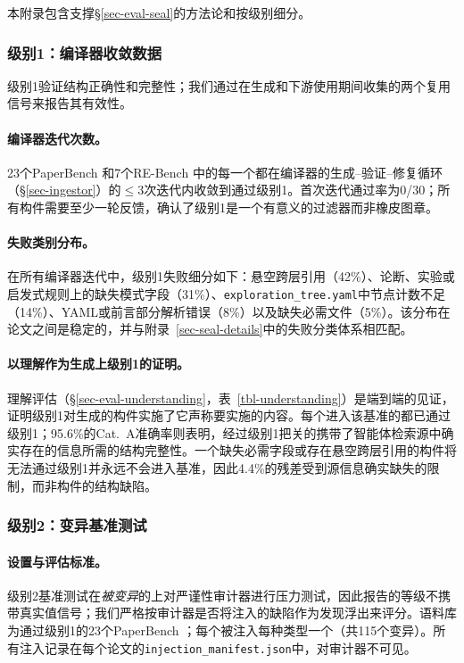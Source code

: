 本附录包含支撑\S\ref{sec-eval-seal}的方法论和按级别细分。

\subsubsection{级别1：编译器收敛数据}
\label{sec-seal-eval-l1}

级别1验证结构正确性和完整性；我们通过在\ara{}生成和下游使用期间收集的两个复用信号来报告其有效性。

\paragraph{编译器迭代次数。}
23个PaperBench \ara{}和7个RE-Bench \ara{}中的每一个都在编译器的生成--验证--修复循环（\S\ref{sec-ingestor}）的$\leq 3$次迭代内收敛到通过级别1。首次迭代通过率为0/30；所有构件需要至少一轮反馈，确认了级别1是一个有意义的过滤器而非橡皮图章。

\paragraph{失败类别分布。}
在所有编译器迭代中，级别1失败细分如下：悬空跨层引用（42\%）、论断、实验或启发式规则上的缺失模式字段（31\%）、\texttt{exploration\_tree.yaml}中节点计数不足（14\%）、YAML或前言部分解析错误（8\%）以及缺失必需文件（5\%）。该分布在论文之间是稳定的，并与附录~\ref{sec-seal-details}中的失败分类体系相匹配。

\paragraph{以理解作为生成\ara{}上级别1的证明。}
理解评估（\S\ref{sec-eval-understanding}，表~\ref{tbl-understanding}）是端到端的见证，证明级别1对生成的构件实施了它声称要实施的内容。每个进入该基准的\ara{}都已通过级别1；95.6\%的Cat.~A准确率则表明，经过级别1把关的\ara{}携带了智能体检索源中确实存在的信息所需的结构完整性。一个缺失必需字段或存在悬空跨层引用的构件将无法通过级别1并永远不会进入基准，因此4.4\%的残差受到源信息确实缺失的限制，而非构件的结构缺陷。

\subsubsection{级别2：变异基准测试}
\label{sec-seal-eval-l2}

\paragraph{设置与评估标准。}
级别2基准测试在\emph{被变异}的\ara{}上对严谨性审计器进行压力测试，因此报告的等级不携带真实值信号；我们严格按审计器是否将注入的缺陷作为发现浮出来评分。语料库为通过级别1的23个PaperBench \ara{}；每个被注入每种类型一个（共115个变异）。所有注入记录在每个论文的\texttt{injection\_manifest.json}中，对审计器不可见。

